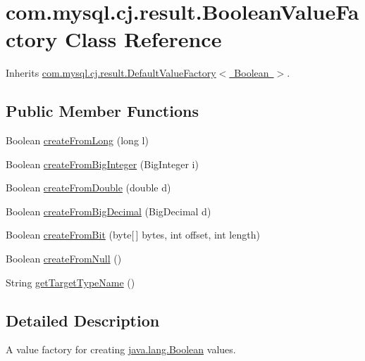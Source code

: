 \hypertarget{classcom_1_1mysql_1_1cj_1_1result_1_1_boolean_value_factory}{}\section{com.\+mysql.\+cj.\+result.\+Boolean\+Value\+Factory Class Reference}
\label{classcom_1_1mysql_1_1cj_1_1result_1_1_boolean_value_factory}


Inherits \mbox{\hyperlink{classcom_1_1mysql_1_1cj_1_1result_1_1_default_value_factory}{com.\+mysql.\+cj.\+result.\+Default\+Value\+Factory$<$ Boolean $>$}}.

\subsection*{Public Member Functions}
\begin{DoxyCompactItemize}
\item 
Boolean \mbox{\hyperlink{classcom_1_1mysql_1_1cj_1_1result_1_1_boolean_value_factory_ac742482e85b92ebd7c9dfb15018da704}{create\+From\+Long}} (long l)
\item 
Boolean \mbox{\hyperlink{classcom_1_1mysql_1_1cj_1_1result_1_1_boolean_value_factory_a5be4993261599b62bdf667ef9195f67a}{create\+From\+Big\+Integer}} (Big\+Integer i)
\item 
Boolean \mbox{\hyperlink{classcom_1_1mysql_1_1cj_1_1result_1_1_boolean_value_factory_a3f9de612b9f966cec999d7f860863d61}{create\+From\+Double}} (double d)
\item 
Boolean \mbox{\hyperlink{classcom_1_1mysql_1_1cj_1_1result_1_1_boolean_value_factory_ab31d0d103b290ef094941ecb379657a5}{create\+From\+Big\+Decimal}} (Big\+Decimal d)
\item 
Boolean \mbox{\hyperlink{classcom_1_1mysql_1_1cj_1_1result_1_1_boolean_value_factory_ab12565f0992a5b3c6d263ac8a043c5f6}{create\+From\+Bit}} (byte\mbox{[}$\,$\mbox{]} bytes, int offset, int length)
\item 
Boolean \mbox{\hyperlink{classcom_1_1mysql_1_1cj_1_1result_1_1_boolean_value_factory_a15507d2d21b82d7e122aca762951e76c}{create\+From\+Null}} ()
\item 
String \mbox{\hyperlink{classcom_1_1mysql_1_1cj_1_1result_1_1_boolean_value_factory_a7c48686f9ebcc00e4b5adda9fb66e05e}{get\+Target\+Type\+Name}} ()
\end{DoxyCompactItemize}


\subsection{Detailed Description}
A value factory for creating \mbox{\hyperlink{}{java.\+lang.\+Boolean}} values. 

